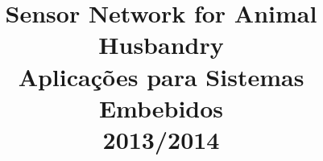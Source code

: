 \documentclass[times, 10pt,twocolumn]{article}
\begin{document}
\title{\huge{Sensor Network for Animal Husbandry} \\[0,1in] \textmd{Aplicações para Sistemas Embebidos \\[0,05in] 2013/2014}}

\maketitle
\thispagestyle{empty}

\begin{abstract}

\end{abstract}

















\nocite{ex1}


\end{document}
